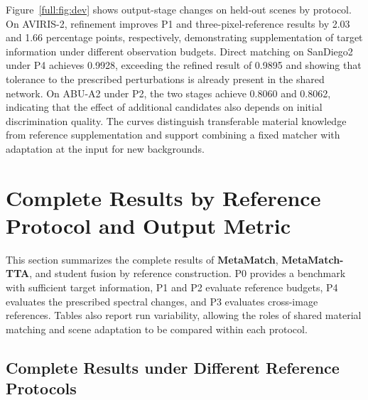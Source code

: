 \documentclass[a4paper,11pt]{article}
\newcommand{\method}{\textbf{MetaMatch-TTA}}
\newcommand{\matcher}{\textbf{MetaMatch}}
\begin{document}
Figure~\ref{full:fig:dev} shows output-stage changes on held-out scenes by protocol. On AVIRIS-2, refinement improves P1 and three-pixel-reference results by 2.03 and 1.66 percentage points, respectively, demonstrating supplementation of target information under different observation budgets. Direct matching on SanDiego2 under P4 achieves 0.9928, exceeding the refined result of 0.9895 and showing that tolerance to the prescribed perturbations is already present in the shared network. On ABU-A2 under P2, the two stages achieve 0.8060 and 0.8062, indicating that the effect of additional candidates also depends on initial discrimination quality. The curves distinguish transferable material knowledge from reference supplementation and support combining a fixed matcher with adaptation at the input for new backgrounds.
\FloatBarrier


\section{Complete Results by Reference Protocol and Output Metric}\label{app:protocol_detail}
This section summarizes the complete results of \matcher{}, \method{}, and student fusion by reference construction. P0 provides a benchmark with sufficient target information, P1 and P2 evaluate reference budgets, P4 evaluates the prescribed spectral changes, and P3 evaluates cross-image references. Tables also report run variability, allowing the roles of shared material matching and scene adaptation to be compared within each protocol.






\subsection{Complete Results under Different Reference Protocols}
\end{document}

